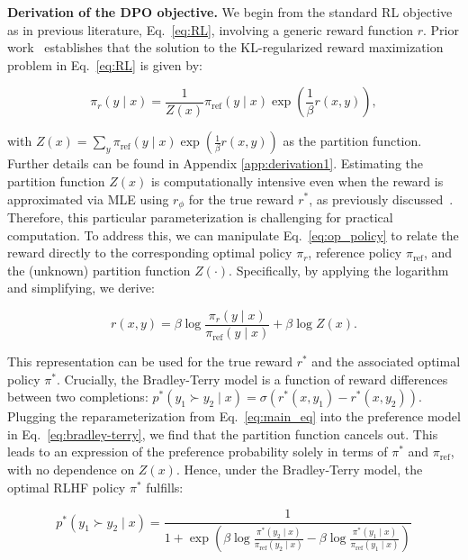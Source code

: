 \textbf{Derivation of the DPO objective.} We begin from the standard RL objective as in previous literature, Eq.~\ref{eq:RL}, involving a generic reward function $r$. Prior work~\citep{peters2007reinforcement, peng2019advantage, korbak2022reinforcement, go2023aligning} establishes that the solution to the KL-regularized reward maximization problem in Eq.~\ref{eq:RL} is given by:

\begin{equation}\label{eq:op_policy}
    \pi_r(y\mid x) = \frac{1}{Z(x)}\pi_\text{ref}(y\mid x)\exp\left(\frac{1}{\beta}r(x, y)\right),
\end{equation}

with $Z(x) =\sum_{y}\pi_\text{ref}(y\mid x)\exp\left(\frac{1}{\beta}r(x, y)\right)$ as the partition function. Further details can be found in Appendix \ref{app:derivation1}. Estimating the partition function $Z(x)$ is computationally intensive even when the reward is approximated via MLE using $r_{\phi}$ for the true reward $r^*$, as previously discussed~\citep{korbak2022reinforcement, go2023aligning}. Therefore, this particular parameterization is challenging for practical computation. To address this, we can manipulate Eq.~\ref{eq:op_policy} to relate the reward directly to the corresponding optimal policy $\pi_r$, reference policy $\pi_\text{ref}$, and the (unknown) partition function $Z(\cdot)$. Specifically, by applying the logarithm and simplifying, we derive:

\begin{equation}\label{eq:main_eq}
    r(x,y) =\beta \log \frac{\pi_r(y\mid x)}{\pi_\text{ref}(y\mid x)} + \beta \log Z(x).
\end{equation}

This representation can be used for the true reward $r^*$ and the associated optimal policy $\pi^*$. Crucially, the Bradley-Terry model is a function of reward differences between two completions: ${p^*(y_1 \succ y_2 \mid x) = \sigma(r^*(x, y_1) - r^*(x, y_2))}$. Plugging the reparameterization from Eq.~\ref{eq:main_eq} into the preference model in Eq.~\ref{eq:bradley-terry}, we find that the partition function cancels out. This leads to an expression of the preference probability solely in terms of $\pi^*$ and $\pi_\text{ref}$, with no dependence on $Z(x)$. Hence, under the Bradley-Terry model, the optimal RLHF policy $\pi^*$ fulfills:

\begin{equation}\label{eq:objective}
    p^*(y_1\succ y_2 \mid x)=\frac{1}{1 + \exp\left(\beta \log \frac{\pi^*(y_2\mid x)}{\pi_\text{ref}(y_2\mid x)} - \beta \log \frac{\pi^*(y_1\mid x)}{\pi_\text{ref}(y_1\mid x)}\right)}
\end{equation}

